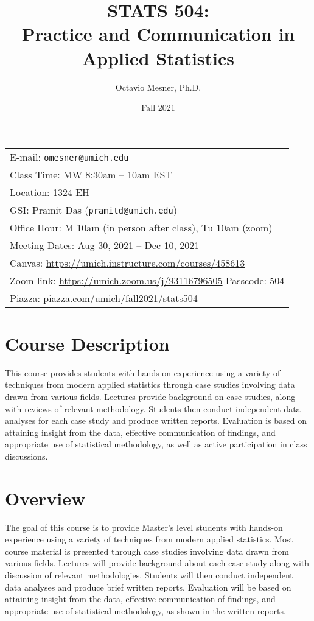 \documentclass[11pt]{article}
\title{STATS 504: \\ Practice and Communication in Applied Statistics}
\author{Octavio Mesner, Ph.D.}
\date{Fall 2021}
\begin{document}
\maketitle
\begin{tabular}{l}
E-mail: \texttt{omesner@umich.edu} \\
Class Time: MW 8:30am -- 10am EST \\
Location: 1324 EH \\
GSI: Pramit Das (\texttt{pramitd@umich.edu}) \\
Office Hour: M 10am (in person after class), Tu 10am (zoom) \\
Meeting Dates: Aug 30, 2021 -- Dec 10, 2021\\
Canvas: \url{https://umich.instructure.com/courses/458613} \\
Zoom link: \url{https://umich.zoom.us/j/93116796505} \hfill  Passcode: 504 \\
Piazza: \url{piazza.com/umich/fall2021/stats504}
\end{tabular}

\section*{Course Description}

This course provides students with hands-on experience using a variety of techniques from modern applied statistics through case studies involving data drawn from various fields.
Lectures  provide background on case studies, along with reviews of relevant methodology.
Students then conduct independent data analyses for each case study and produce written reports.
Evaluation is based on attaining insight from the data, effective communication of findings, and appropriate use of statistical methodology, as well as active participation in class discussions.

\section*{Overview}

The goal of this course is to provide Master’s level students with hands-on experience using a variety of techniques from modern applied statistics.
Most course material is presented through case studies involving data drawn from various fields.
Lectures will provide background about each case study along with discussion of relevant methodologies.
Students will then conduct independent data analyses and produce brief written reports.
Evaluation will be based on attaining insight from the data, effective communication of findings, and appropriate use of statistical methodology, as shown in the written reports.
\end{document}

